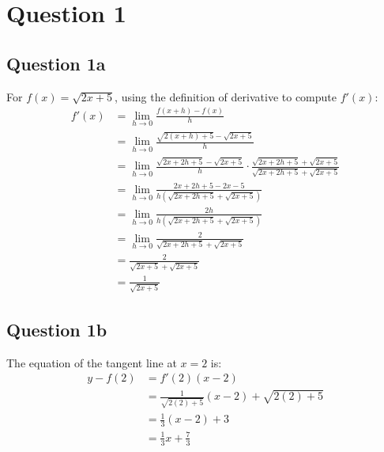 \documentclass{article}
\begin{document}
\newcommand{\documentcourse}{MATH1851}
\newcommand{\documentnumber}{2}





\section*{Question 1}
\subsection*{Question 1a}
For $f(x)=\sqrt{2x+5}$, using the definition of derivative to compute $f'(x)$:
\begin{align*}
    f'(x) & = \lim_{h\to0}\frac{f(x+h)-f(x)}{h}                                                                                  \\
          & = \lim_{h\to0}\frac{\sqrt{2(x+h)+5}-\sqrt{2x+5}}{h}                                                                  \\
          & = \lim_{h\to0}\frac{\sqrt{2x+2h+5}-\sqrt{2x+5}}{h}\cdot\frac{\sqrt{2x+2h+5}+\sqrt{2x+5}}{\sqrt{2x+2h+5}+\sqrt{2x+5}} \\
          & = \lim_{h\to0}\frac{2x+2h+5-2x-5}{h\left(\sqrt{2x+2h+5}+\sqrt{2x+5}\right)}                                          \\
          & = \lim_{h\to0}\frac{2h}{h\left(\sqrt{2x+2h+5}+\sqrt{2x+5}\right)}                                                    \\
          & = \lim_{h\to0}\frac{2}{\sqrt{2x+2h+5}+\sqrt{2x+5}}                                                                   \\
          & = \frac{2}{\sqrt{2x+5}+\sqrt{2x+5}}                                                                                  \\
          & = \frac{1}{\sqrt{2x+5}}
\end{align*}

\subsection*{Question 1b}
The equation of the tangent line at $x=2$ is:
\begin{align*}
    y -f(2) & = f'(2)(x-2)                                 \\
            & = \frac{1}{\sqrt{2(2)+5}}(x-2)+\sqrt{2(2)+5} \\
            & = \frac{1}{3}(x-2)+3                         \\
            & = \frac{1}{3}x+\frac{7}{3}
\end{align*}
\end{document}
